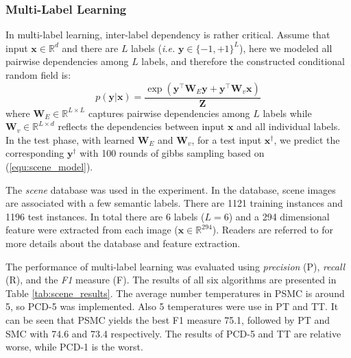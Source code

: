 \subsubsection{Multi-Label Learning}
In multi-label learning, inter-label dependency is rather critical. Assume that input $\mathbf{x}\in \mathbb{R}^d$ and there are $L$ labels (\emph{i.e.} $\mathbf{y}\in\{-1,+1\}^L$), here we modeled all pairwise dependencies among $L$ labels, and therefore 
the constructed conditional random field is:
\begin{equation}
	p(\mathbf{y}|\mathbf{x})=\frac{\exp(\mathbf{y}^\top\mathbf{W}_E \mathbf{y}+\mathbf{y}^\top \mathbf{W}_v \mathbf{x})}{\mathbf{Z}}
	\label{equ:scene_model}
\end{equation}
where $\mathbf{W}_E\in \mathbb{R}^{L\times L}$ captures pairwise dependencies among $L$ labels while $\mathbf{W}_v\in \mathbb{R}^{L\times d}$ reflects the 
dependencies between input $\mathbf{x}$ and all individual labels.   
In the test phase, with learned $\mathbf{W}_E$ and $\mathbf{W}_v$, for a test input $\mathbf{x}^\dagger$, we predict the corresponding $\mathbf{y}^\dagger$ with 
100 rounds of gibbs sampling based on (\ref{equ:scene_model}).  

The \emph{scene} database \citep{scene_database} was used in the experiment.  In the database, scene images are associated with a few semantic labels.
There are 1121 training instances and 1196 test instances.  In total there are 6 labels ($L=6$) and a 294 dimensional feature were extracted from each image         
($\mathbf{x}\in\mathbb{R}^{294}$). Readers are referred to \cite{scene_database} for more details about the database and feature extraction.  

The performance of multi-label learning was evaluated using \emph{precision} (P), \emph{recall} (R), and the \emph{F1} measure (F). 
The results of all six algorithms are presented in Table \ref{tab:scene_results}.     
The average number temperatures in PSMC is around 5, so PCD-5 was implemented. Also 5 temperatures were use in PT and TT.    
It can be seen that PSMC yields the best F1 measure 75.1, followed by PT and SMC with 74.6 and 73.4 respectively. The results of PCD-5 and TT             
are relative worse, while PCD-1 is the worst.  


